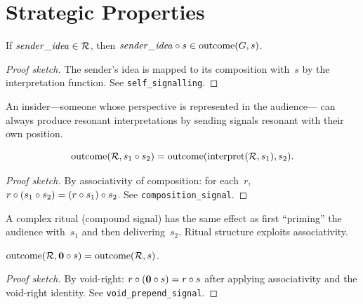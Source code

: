 \section{Strategic Properties}
\label{sec:ch2:strategic}

\begin{theorem}
\label{thm:self-signalling}
If $\mathit{sender\_idea} \in \mathcal{R}$, then
$\mathit{sender\_idea} \circ s \in \operatorname{outcome}(G, s)$.
\end{theorem}

\begin{proof}[Proof sketch]
The sender's idea is mapped to its composition with~$s$ by the
interpretation function.  See \texttt{self\_signalling}.
\end{proof}

\begin{remark}
An insider---someone whose perspective is represented in the audience---
can always produce resonant interpretations by sending signals resonant
with their own position.
\end{remark}

\begin{theorem}
\label{thm:composition-signal}
\[
  \operatorname{outcome}(\mathcal{R}, s_1 \circ s_2)
  = \operatorname{outcome}(\operatorname{interpret}(\mathcal{R}, s_1), s_2).
\]
\end{theorem}

\begin{proof}[Proof sketch]
By associativity of composition: for each~$r$,
$r \circ (s_1 \circ s_2) = (r \circ s_1) \circ s_2$.
See \texttt{composition\_signal}.
\end{proof}

\begin{remark}
A complex ritual (compound signal) has the same effect as first
``priming'' the audience with~$s_1$ and then delivering~$s_2$.  Ritual
structure exploits associativity.
\end{remark}

\begin{theorem}
\label{thm:void-prepend}
$\operatorname{outcome}(\mathcal{R}, \mathbf{0} \circ s)
 = \operatorname{outcome}(\mathcal{R}, s)$.
\end{theorem}

\begin{proof}[Proof sketch]
By void-right: $r \circ (\mathbf{0} \circ s) = r \circ s$ after
applying associativity and the void-right identity.
See \texttt{void\_prepend\_signal}.
\end{proof}

